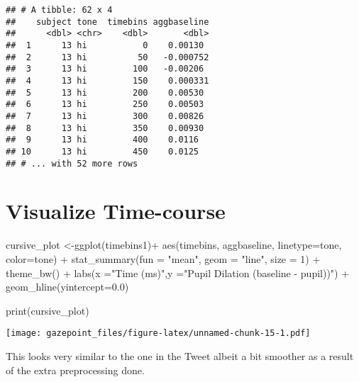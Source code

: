 \documentclass[
]{article}
\newenvironment{Shaded}{\begin{snugshade}}{\end{snugshade}}
\newcommand{\AttributeTok}[1]{\textcolor[rgb]{0.77,0.63,0.00}{#1}}
\newcommand{\DecValTok}[1]{\textcolor[rgb]{0.00,0.00,0.81}{#1}}
\newcommand{\FloatTok}[1]{\textcolor[rgb]{0.00,0.00,0.81}{#1}}
\newcommand{\FunctionTok}[1]{\textcolor[rgb]{0.00,0.00,0.00}{#1}}
\newcommand{\NormalTok}[1]{#1}
\newcommand{\OtherTok}[1]{\textcolor[rgb]{0.56,0.35,0.01}{#1}}
\newcommand{\SpecialCharTok}[1]{\textcolor[rgb]{0.00,0.00,0.00}{#1}}
\newcommand{\StringTok}[1]{\textcolor[rgb]{0.31,0.60,0.02}{#1}}
\begin{document}
\begin{verbatim}
## # A tibble: 62 x 4
##    subject tone  timebins aggbaseline
##      <dbl> <chr>    <dbl>       <dbl>
##  1      13 hi           0    0.00130 
##  2      13 hi          50   -0.000752
##  3      13 hi         100   -0.00206 
##  4      13 hi         150    0.000331
##  5      13 hi         200    0.00530 
##  6      13 hi         250    0.00503 
##  7      13 hi         300    0.00826 
##  8      13 hi         350    0.00930 
##  9      13 hi         400    0.0116  
## 10      13 hi         450    0.0125  
## # ... with 52 more rows
\end{verbatim}

\hypertarget{visualize-time-course}{%
\section{Visualize Time-course}\label{visualize-time-course}}

\begin{Shaded}
\begin{Highlighting}[]
\NormalTok{cursive\_plot }\OtherTok{\textless{}{-}}\FunctionTok{ggplot}\NormalTok{(timebins1)}\SpecialCharTok{+}
  \FunctionTok{aes}\NormalTok{(timebins, aggbaseline, }\AttributeTok{linetype=}\NormalTok{tone, }\AttributeTok{color=}\NormalTok{tone) }\SpecialCharTok{+}
  \FunctionTok{stat\_summary}\NormalTok{(}\AttributeTok{fun =} \StringTok{"mean"}\NormalTok{, }\AttributeTok{geom =} \StringTok{"line"}\NormalTok{, }\AttributeTok{size =} \DecValTok{1}\NormalTok{) }\SpecialCharTok{+}
  \FunctionTok{theme\_bw}\NormalTok{() }\SpecialCharTok{+}
  \FunctionTok{labs}\NormalTok{(}\AttributeTok{x =}\StringTok{"Time (ms)"}\NormalTok{,}\AttributeTok{y =}\StringTok{"Pupil Dilation (baseline {-} pupil))"}\NormalTok{) }\SpecialCharTok{+}
  \FunctionTok{geom\_hline}\NormalTok{(}\AttributeTok{yintercept=}\FloatTok{0.0}\NormalTok{)}

\FunctionTok{print}\NormalTok{(cursive\_plot)}
\end{Highlighting}
\end{Shaded}

\texttt{[image: gazepoint\_files/figure-latex/unnamed-chunk-15-1.pdf]}

This looks very similar to the one in the Tweet albeit a bit smoother as
a result of the extra preprocessing done.
\end{document}
